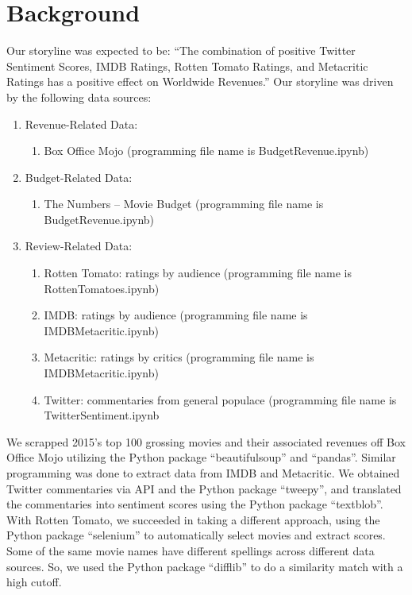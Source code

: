 \documentclass{article}
\begin{document}
\section{Background}

Our storyline was expected to be: “The combination of positive Twitter Sentiment Scores, IMDB Ratings, Rotten Tomato Ratings, and Metacritic Ratings has a positive effect on Worldwide Revenues.”  Our storyline was driven by the following data sources:

\begin{enumerate}
	\item	Revenue-Related Data:
	\begin{enumerate}
 		\item	Box Office Mojo (programming file name is BudgetRevenue.ipynb)
 	\end{enumerate}
	\item	Budget-Related Data:
 	\begin{enumerate}
 		\item	The Numbers – Movie Budget (programming file name is BudgetRevenue.ipynb)
 	\end{enumerate}
	\item	Review-Related Data:
 	\begin{enumerate}
 		\item	Rotten Tomato: ratings by audience (programming file name is RottenTomatoes.ipynb)
 		\item	IMDB:  ratings by audience (programming file name is IMDBMetacritic.ipynb)
 		\item	Metacritic:  ratings by critics (programming file name is IMDBMetacritic.ipynb)
 		\item	Twitter:  commentaries from general populace (programming file name is TwitterSentiment.ipynb
 	\end{enumerate}
\end{enumerate}

We scrapped 2015’s top 100 grossing movies and their associated revenues off Box Office Mojo utilizing the Python package “beautifulsoup” and “pandas”.  Similar programming was done to extract data from IMDB and Metacritic.  We obtained Twitter commentaries via API and the Python package “tweepy”, and translated the commentaries into sentiment scores using the Python package “textblob”.  With Rotten Tomato, we succeeded in taking a different approach, using the Python package “selenium” to automatically select movies and extract scores.  Some of the same movie names have different spellings across different data sources. So, we used the Python package “difflib” to do a similarity match with a high cutoff.
  
\end{document}
